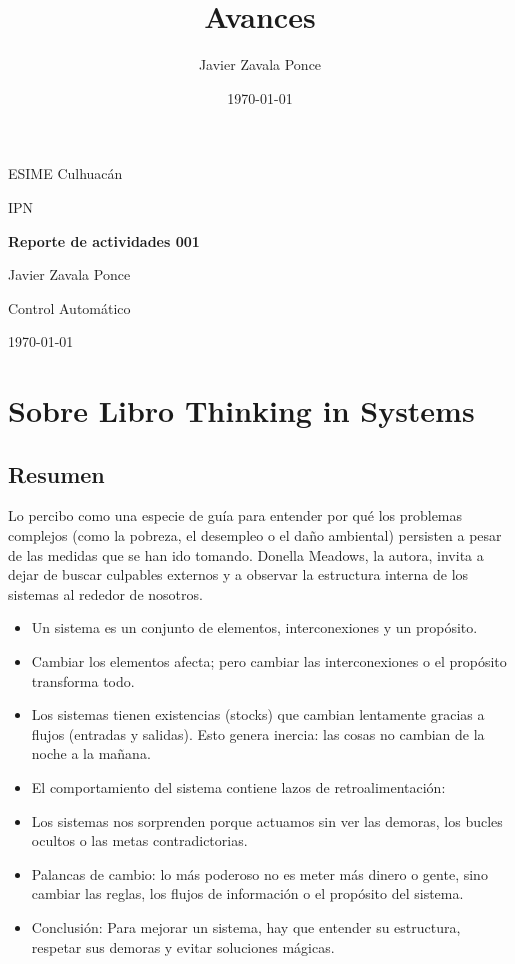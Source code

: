 \documentclass[12pt]{report}
\title{Avances}
\author{Javier Zavala Ponce}
\date{\today}
\begin{document}
	
	\begin{titlepage}
		\centering
		\vspace*{2cm}
		{\LARGE ESIME Culhuacán\par}
		\vspace{1cm}
		{\Large IPN\par}
		\vspace{2cm}
		{\bfseries\Huge Reporte de actividades 001\par}
		\vspace{2cm}
		{\large Javier Zavala Ponce\par}
		{\large Control Automático\par}
		\vfill
		{\large \today\par}
	\end{titlepage}
	
	\tableofcontents
	\newpage
	
	\chapter{Sobre Libro Thinking in Systems}
	\section{Resumen}
Lo percibo como una especie de guía para entender por qué los problemas complejos (como la pobreza, el desempleo o el daño ambiental) persisten a pesar de las medidas que se han ido tomando. Donella Meadows, la autora, invita a dejar de buscar culpables externos y a observar la estructura interna de los sistemas al rededor de nosotros.


\begin{itemize}
	\item Un sistema es un conjunto de elementos, interconexiones y un propósito. 
	
	\item Cambiar los elementos afecta; pero cambiar las interconexiones o el propósito transforma todo.
	

\item Los sistemas tienen existencias (stocks) que cambian lentamente gracias a flujos (entradas y salidas). Esto genera inercia: las cosas no cambian de la noche a la mañana.

\item El comportamiento del sistema contiene lazos de retroalimentación:

\item Los sistemas nos sorprenden porque actuamos sin ver las demoras, los bucles ocultos o las metas contradictorias.

\item Palancas de cambio: lo más poderoso no es meter más dinero o gente, sino cambiar las reglas, los flujos de información o el propósito del sistema.

\item Conclusión: Para mejorar un sistema, hay que entender su estructura, respetar sus demoras y evitar soluciones mágicas.

\end{itemize}
	
\end{document}
